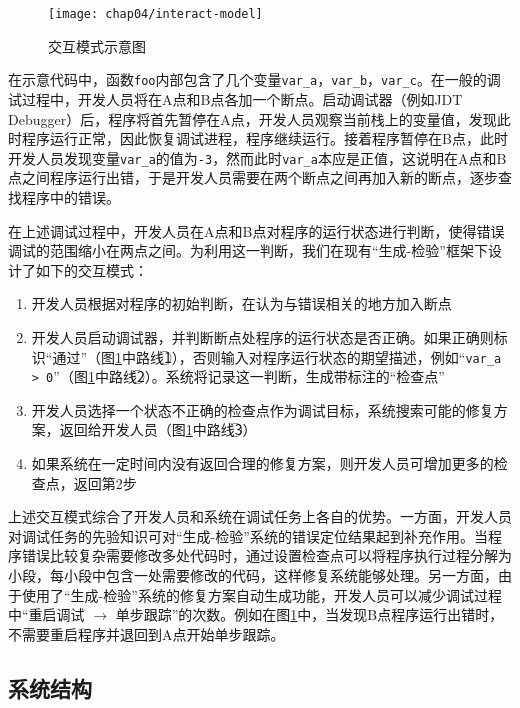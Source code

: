 \begin{figure}
	\centering
	\texttt{[image: chap04/interact-model]}
	\caption{交互模式示意图}
	\label{fig:interact-model}
\end{figure}

在示意代码中，函数\texttt{foo}内部包含了几个变量\texttt{var\_a}，\texttt{var\_b}，\texttt{var\_c}。在一般的调试过程中，开发人员将在A点和B点各加一个断点。启动调试器（例如JDT Debugger）后，程序将首先暂停在A点，开发人员观察当前栈上的变量值，发现此时程序运行正常，因此恢复调试进程，程序继续运行。接着程序暂停在B点，此时开发人员发现变量\texttt{var\_a}的值为\texttt{-3}，然而此时\texttt{var\_a}本应是正值，这说明在A点和B点之间程序运行出错，于是开发人员需要在两个断点之间再加入新的断点，逐步查找程序中的错误。

在上述调试过程中，开发人员在A点和B点对程序的运行状态进行判断，使得错误调试的范围缩小在两点之间。为利用这一判断，我们在现有“生成-检验”框架下设计了如下的交互模式：

\begin{enumerate}[1.]
	\item 开发人员根据对程序的初始判断，在认为与错误相关的地方加入断点
	\item 开发人员启动调试器，并判断断点处程序的运行状态是否正确。如果正确则标识“通过”（图\ref{fig:interact-model}中路线\textcircled{1}），否则输入对程序运行状态的期望描述，例如“\texttt{var\_a > 0}”（图\ref{fig:interact-model}中路线\textcircled{2}）。系统将记录这一判断，生成带标注的“检查点”
	\item 开发人员选择一个状态不正确的检查点作为调试目标，系统搜索可能的修复方案，返回给开发人员（图\ref{fig:interact-model}中路线\textcircled{3}）
	\item 如果系统在一定时间内没有返回合理的修复方案，则开发人员可增加更多的检查点，返回第2步
\end{enumerate}

上述交互模式综合了开发人员和系统在调试任务上各自的优势。一方面，开发人员对调试任务的先验知识可对“生成-检验”系统的错误定位结果起到补充作用。当程序错误比较复杂需要修改多处代码时，通过设置检查点可以将程序执行过程分解为小段，每小段中包含一处需要修改的代码，这样修复系统能够处理。另一方面，由于使用了“生成-检验”系统的修复方案自动生成功能，开发人员可以减少调试过程中“重启调试 $\rightarrow$ 单步跟踪”的次数。例如在图\ref{fig:interact-model}中，当发现B点程序运行出错时，不需要重启程序并退回到A点开始单步跟踪。

\subsection{系统结构}%


